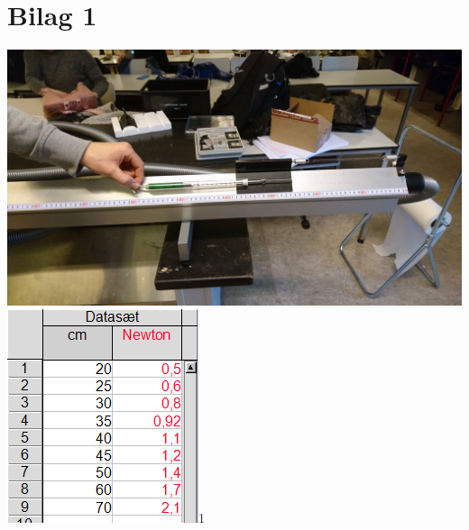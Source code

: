 \section*{Bilag 1}
\begin{center}
\includegraphics[scale=0.2]{Billeder/forsoeg1}
\includegraphics[scale=1]{Billeder/dataforsoeg1}1
\end{center}